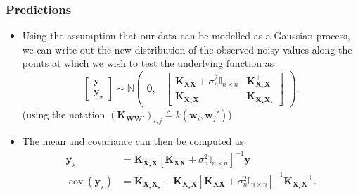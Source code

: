 \documentclass[9pt,hyperref={pdfpagelabels=false},xcolor=table]{beamer}
\begin{document}
\begin{frame}
    \frametitle{Predictions}
    \begin{itemize}
        \item Using the assumption that our data can be modelled as a Gaussian process, we can write out the new distribution of the observed noisy values along the points at which we wish to test the underlying function as
              \[
                  \begin{bmatrix}
                      \bm{y} \\
                      \bm{y}_{\star}
                  \end{bmatrix}
                  \sim \mathbb{N}
                  \begin{pmatrix}
                      \bm{0}, &
                      {
                              \begin{bmatrix}
                                  \bm{K_{XX}} + \sigma_n^2 \mathbb{I}_{n \times n} & \bm{K_{X_{\star}X}^{\intercal}} \\
                                  \bm{K_{X_{\star}X}}                              & \bm{K_{X_{\star}X_{\star}}}
                              \end{bmatrix}
                          }
                  \end{pmatrix}.
              \]
              (using the notation $\left( \bm{K}_{\bm{W} \bm{W}'} \right)_{i,j} \triangleq k \left( \bm{w}_i , \bm{w}_j' \right)$)
              \pause
        \item The mean and covariance can then be computed as
              \begin{align*}
                  \overline{\bm{y}_{\star}}           & = \bm{K_{X_{\star}X}} \left[ \bm{K_{XX}} + \sigma_n^2 \mathbb{I}_{n \times n} \right]^{-1} \bm{y}                                                         \\
                  \operatorname{cov} (\bm{y}_{\star}) & = \bm{K_{X_{\star}X_{\star}}} - \bm{K_{X_{\star}X}} \left[ \bm{K_{XX}} + \sigma_n^2 \mathbb{I}_{n \times n} \right]^{-1} \bm{K_{X_{\star}X}}^{\intercal}.
              \end{align*}
    \end{itemize}
\end{frame}
\end{document}
